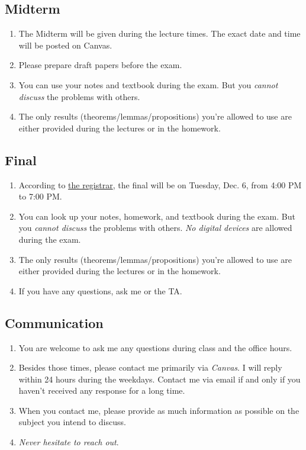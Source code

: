 \documentclass[12pt]{article}
\begin{document}
\subsection{Midterm}
\begin{enumerate}
	\item The Midterm will be given during the lecture times. The exact date and time will be posted on Canvas. 
	\item Please prepare draft papers before the exam. 
	\item You can use your notes and textbook during the exam. But you \emph{cannot discuss} the problems with others. 
	\item The only results (theorems/lemmas/propositions) you're allowed to use are either provided during the lectures or in the homework. 
\end{enumerate}

\subsection{Final}
\begin{enumerate}
	\item According to \href{https://registrar.ucsc.edu/soc/final-examinations.html}{the registrar}, the final will be on Tuesday, Dec. 6, from 4:00 PM to 7:00 PM. 
	\item You can look up your notes, homework, and textbook during the exam. But you \emph{cannot discuss} the problems with others. \emph{No digital devices} are allowed during the exam. 
	\item The only results (theorems/lemmas/propositions) you're allowed to use are either provided during the lectures or in the homework.
	\item If you have any questions, ask me or the TA.
\end{enumerate}
	
\subsection{Communication}
\begin{enumerate}
	\item You are welcome to ask me any questions during class and the office hours.
	\item Besides those times, please contact me primarily via \emph{Canvas}. I will reply within 24 hours during the weekdays. Contact me via email if and only if you haven't received any response for a long time.  
	\item When you contact me, please provide as much information as possible on the subject you intend to discuss. 
	\item \emph{Never hesitate to reach out}. 
\end{enumerate}
\end{document}
